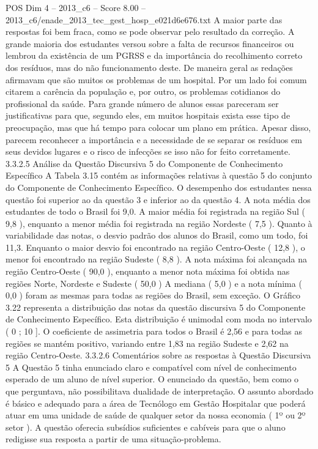 \begin{textsample}{POS Dim 4 – 2013\_c6 – Score 8.00 – 2013\_c6/enade\_2013\_tec\_gest\_hosp\_e021d6e676.txt}
A maior parte das respostas foi bem fraca, como se pode observar pelo resultado da correção.
A grande maioria dos estudantes versou sobre a falta de recursos financeiros ou lembrou da existência de um PGRSS e da importância do recolhimento correto dos resíduos, mas do não funcionamento deste.
De maneira geral as redações afirmavam que são muitos os problemas de um hospital.
Por um lado foi comum citarem a carência da população e, por outro, os problemas cotidianos do profissional da saúde.
Para grande número de alunos essas pareceram ser justificativas para que, segundo eles, em muitos hospitais exista esse tipo de preocupação, mas que há tempo para colocar um plano em prática.
Apesar disso, parecem reconhecer a importância e a necessidade de se separar os resíduos em seus devidos lugares e o risco de infecções se isso não for feito corretamente. 3.3.2.5 Análise da Questão Discursiva 5 do Componente de Conhecimento Específico A Tabela 3.15 contém as informações relativas à questão 5 do conjunto do Componente de Conhecimento Específico.
O desempenho dos estudantes nessa questão foi superior ao da questão 3 e inferior ao da questão 4.
A nota média dos estudantes de todo o Brasil foi 9,0.
A maior média foi registrada na região Sul ( 9,8 ), enquanto a menor média foi registrada na região Nordeste ( 7,5 ).
Quanto à variabilidade das notas, o desvio padrão dos alunos do Brasil, como um todo, foi 11,3.
Enquanto o maior desvio foi encontrado na região Centro-Oeste ( 12,8 ), o menor foi encontrado na região Sudeste ( 8,8 ).
A nota máxima foi alcançada na região Centro-Oeste ( 90,0 ), enquanto a menor nota máxima foi obtida nas regiões Norte, Nordeste e Sudeste ( 50,0 ) A mediana ( 5,0 ) e a nota mínima ( 0,0 ) foram as mesmas para todas as regiões do Brasil, sem exceção.
O Gráfico 3.22 representa a distribuição das notas da questão discursiva 5 do Componente de Conhecimento Específico.
Esta distribuição é unimodal com moda no intervalo ( 0 ; 10 ].
O coeficiente de assimetria para todos o Brasil é 2,56 e para todas as regiões se mantém positivo, variando entre 1,83 na região Sudeste e 2,62 na região Centro-Oeste. 3.3.2.6 Comentários sobre as respostas à Questão Discursiva 5 A Questão 5 tinha enunciado claro e compatível com nível de conhecimento esperado de um aluno de nível superior.
O enunciado da questão, bem como o que perguntava, não possibilitava dualidade de interpretação.
O assunto abordado é básico e adequado para a área de Tecnólogo em Gestão Hospitalar que poderá atuar em uma unidade de saúde de qualquer setor da nossa economia ( 1º ou 2º setor ).
A questão oferecia subsídios suficientes e cabíveis para que o aluno redigisse sua resposta a partir de uma situação-problema.

\end{textsample}
